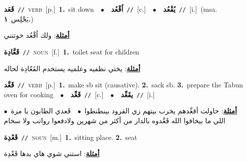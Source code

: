 \documentclass[10pt,a4paper,twoside]{article} %
\begin{document}
\begin{multicols}{2}
{\setlength\topsep{0pt}\textbf{\foreignlanguage{arabic}{قَعَد}}\ {\color{gray}\texttt{//}\color{black}}\ \textsc{verb}\ [p.]\ \textbf{1.}~sit down\ \ $\bullet$\ \ \setlength\topsep{0pt}\textbf{\foreignlanguage{arabic}{اُقْعُد}}\ {\color{gray}\texttt{//}\color{black}}\ [c.]\ \ $\bullet$\ \ \setlength\topsep{0pt}\textbf{\foreignlanguage{arabic}{يُقْعُد}}\ {\color{gray}\texttt{//}\color{black}}\ [i.]\ \color{gray}(msa. \foreignlanguage{arabic}{يَجْلِس}~\foreignlanguage{arabic}{\textbf{١.}})\color{black}\  \begin{flushright}\color{gray}\foreignlanguage{arabic}{\textbf{\underline{\foreignlanguage{arabic}{أمثلة}}}: ولك اُقْعُد خوتتني}\end{flushright}\color{black}} \vspace{2mm}

{\setlength\topsep{0pt}\textbf{\foreignlanguage{arabic}{قَعَّادِة}}\ {\color{gray}\texttt{//}\color{black}}\ \textsc{noun}\ [f.]\ \textbf{1.}~toilet seat for children\  \begin{flushright}\color{gray}\foreignlanguage{arabic}{\textbf{\underline{\foreignlanguage{arabic}{أمثلة}}}: يختي نظفيه وعلميه يستخدم القَعّادِة لحاله}\end{flushright}\color{black}} \vspace{2mm}

{\setlength\topsep{0pt}\textbf{\foreignlanguage{arabic}{قَعَّد}}\ {\color{gray}\texttt{//}\color{black}}\ \textsc{verb}\ [p.]\ \textbf{1.}~make sb sit (causative).  \textbf{2.}~sack sb.  \textbf{3.}~prepare the Tabun oven for cooking\ \ $\bullet$\ \ \setlength\topsep{0pt}\textbf{\foreignlanguage{arabic}{قَعِّد}}\ {\color{gray}\texttt{//}\color{black}}\ [c.]\ \ $\bullet$\ \ \setlength\topsep{0pt}\textbf{\foreignlanguage{arabic}{يقَعِّد}}\ {\color{gray}\texttt{//}\color{black}}\ [i.]\  \begin{flushright}\color{gray}\foreignlanguage{arabic}{\textbf{\underline{\foreignlanguage{arabic}{أمثلة}}}: حاولت أقعِّدهم يخرب بيتهم زي القرود بينطنطوا\ $\bullet$\ \  قَعدي الطابون يا مرة\ $\bullet$\ \  اللي ما بيخافوا الله قَعَّدوه بالدار من أكثر من شهرين ولادفعوا رواتب ولا سخام}\end{flushright}\color{black}} \vspace{2mm}

{\setlength\topsep{0pt}\textbf{\foreignlanguage{arabic}{قَعْدِة}}\ {\color{gray}\texttt{//}\color{black}}\ \textsc{noun}\ [m.]\ \textbf{1.}~sitting place.  \textbf{2.}~seat\  \begin{flushright}\color{gray}\foreignlanguage{arabic}{\textbf{\underline{\foreignlanguage{arabic}{أمثلة}}}: استني شوي هاي بدها قَعْدِة}\end{flushright}\color{black}} \vspace{2mm}


\end{multicols}
\end{document}

